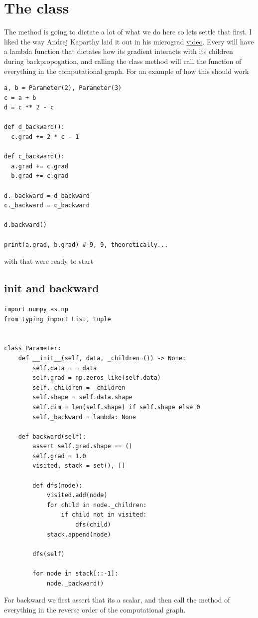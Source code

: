 \documentclass[11pt]{article}
\begin{document}
\section{The class}
The  method is going to dictate a lot of what we do here so lets settle that first. I liked the 
way Andrej Kaparthy laid it out in his micrograd \href{https://www.youtube.com/watch?v=VMj-3S1tku0}{video}. Every  will have a lambda function 
 that dictates how its gradient interacts with its children during backpropogation, and calling
the class method  will call the  function of everything in the computational graph. 
For an example of how this should work
\begin{verbatim}
a, b = Parameter(2), Parameter(3)
c = a + b
d = c ** 2 - c

def d_backward():
  c.grad += 2 * c - 1

def c_backward():
  a.grad += c.grad
  b.grad += c.grad

d._backward = d_backward
c._backward = c_backward

d.backward()

print(a.grad, b.grad) # 9, 9, theoretically...
\end{verbatim}
with that were ready to start
\subsection{init and backward}
\begin{verbatim}
import numpy as np
from typing import List, Tuple


class Parameter:
    def __init__(self, data, _children=()) -> None:
        self.data = = data
        self.grad = np.zeros_like(self.data)
        self._children = _children
        self.shape = self.data.shape
        self.dim = len(self.shape) if self.shape else 0
        self._backward = lambda: None

    def backward(self):
        assert self.grad.shape == ()
        self.grad = 1.0
        visited, stack = set(), []

        def dfs(node):
            visited.add(node)
            for child in node._children:
                if child not in visited:
                    dfs(child)
            stack.append(node)

        dfs(self)

        for node in stack[::-1]:
            node._backward()
\end{verbatim}
For backward we first assert that its a scalar, and then call the  method of everything in the 
reverse order of the computational graph. 
\end{document}

